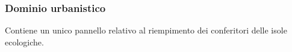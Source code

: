 \documentclass[8pt]{article}
\begin{document}
\subsubsection{Dominio urbanistico}
Contiene un unico pannello relativo al riempimento dei conferitori delle isole ecologiche.

\end{document}
